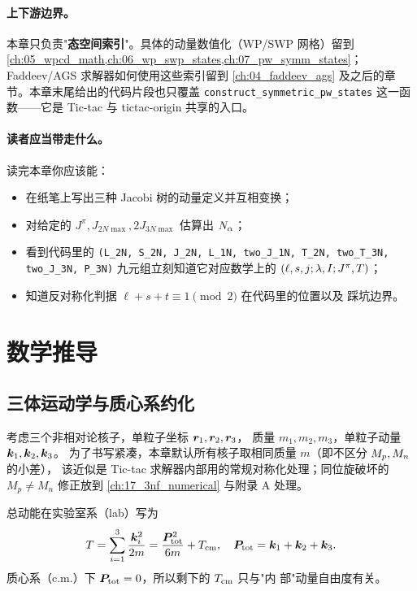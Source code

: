\paragraph{上下游边界。}
本章只负责"\textbf{态空间索引}"。具体的动量数值化（WP/SWP 网格）留到
\cref{ch:05_wpcd_math,ch:06_wp_swp_states,ch:07_pw_symm_states}；
Faddeev/AGS 求解器如何使用这些索引留到 \cref{ch:04_faddeev_ags}
及之后的章节。本章末尾给出的代码片段也只覆盖
\verb|construct_symmetric_pw_states| 这一函数——它是 Tic-tac 与 tictac-origin
共享的入口。

\paragraph{读者应当带走什么。}
读完本章你应该能：
\begin{itemize}
  \item 在纸笔上写出三种 Jacobi 树的动量定义并互相变换；
  \item 对给定的 \(J^\pi, J_{2N\max}, 2J_{3N\max}\) 估算出 \(N_\alpha\)；
  \item 看到代码里的 \texttt{(L\_2N, S\_2N, J\_2N, L\_1N, two\_J\_1N, T\_2N,
        two\_T\_3N, two\_J\_3N, P\_3N)} 九元组立刻知道它对应数学上的
        \((\ell, s, j; \lambda, I; J^\pi, T)\)；
  \item 知道反对称化判据 \(\ell + s + t \equiv 1 \pmod 2\) 在代码里的位置以及
        踩坑边界。
\end{itemize}

\section{数学推导}
\label{sec:ch03-math}

\subsection{三体运动学与质心系约化}
\label{subsec:ch03-kinematics}

考虑三个非相对论核子，单粒子坐标 \(\bm{r}_1, \bm{r}_2, \bm{r}_3\)，
质量 \(m_1, m_2, m_3\)，单粒子动量 \(\bm{k}_1, \bm{k}_2, \bm{k}_3\)。
为了书写紧凑，本章默认所有核子取相同质量 \(m\)（即不区分 \(M_p, M_n\) 的小差），
该近似是 Tic-tac 求解器内部用的常规对称化处理；同位旋破坏的 \(M_p \neq M_n\)
修正放到 \cref{ch:17_3nf_numerical} 与附录 A 处理。

总动能在实验室系（lab）写为
\begin{equation}
\label{eq:ch03-Tlab-decomp}
T = \sum_{i=1}^{3} \frac{\bm{k}_i^2}{2m}
  = \frac{\bm{P}_{\rm tot}^2}{6m} + T_{\rm cm},
\quad
\bm{P}_{\rm tot} = \bm{k}_1 + \bm{k}_2 + \bm{k}_3.
\end{equation}
质心系（c.m.）下 \(\bm{P}_{\rm tot} = 0\)，所以剩下的 \(T_{\rm cm}\) 只与"内
部"动量自由度有关。

